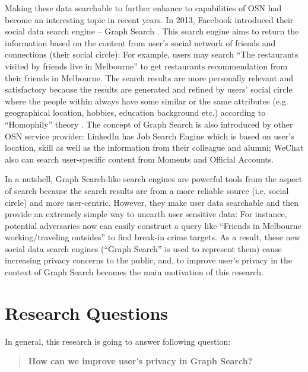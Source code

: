 Making these data searchable to further enhance to capabilities of OSN had become an interesting topic in recent years. In 2013, Facebook introduced their social data search engine -- Graph Search \cite{facebook2013graph}. This search engine aims to return the information based on the content from user's social network of friends and connections (their social circle): For example, users may search ``The restaurants visited by friends live in Melbourne'' to get restaurants recommendation from their friends in Melbourne. The search results are more personally relevant and satisfactory because the results are generated and refined by users' social circle where the people within always have some similar or the same attributes (e.g. geographical location, hobbies, education background etc.) according to ``Homophily'' theory \cite{mcpherson2001birds}. The concept of Graph Search is also introduced by other OSN service provider: LinkedIn has Job Search Engine which is based on user's location, skill as well as the information from their colleague and alumni; WeChat also can search user-specific content from Moments and Official Accounts. 

In a nutshell, Graph Search-like search engines are powerful tools from the aspect of search because the search results are from a more reliable source (i.e. social circle) and more user-centric. However, they make user data searchable and then provide an extremely simple way to unearth user sensitive data: For instance, potential adversaries now can easily construct a query like ``Friends in Melbourne working/traveling outsides'' to find break-in crime targets. As a result, these new social data search engines (``Graph Search'' is used to represent them) cause increasing privacy concerns to the public, and, to improve user's privacy in the context of Graph Search becomes the main motivation of this research.

\section{Research Questions}
In general, this research is going to answer following question:
\begin{quotation}
{ \bf How can we improve user's privacy in Graph Search?}
\end{quotation}


